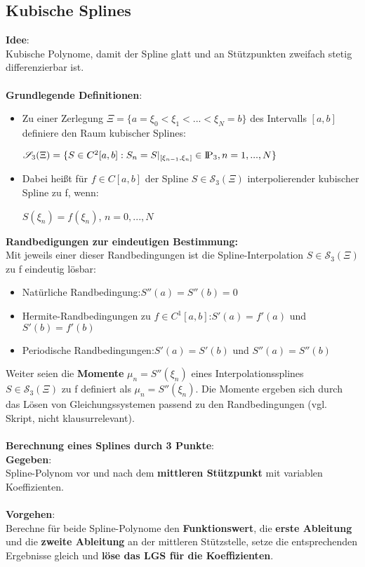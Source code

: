 \documentclass[10pt,a4paper]{article}
\def\polynomials{{\rm I\!P}}
\begin{document}
	\subsection{Kubische Splines}
	\textbf{Idee}:\\Kubische Polynome, damit der Spline glatt und an Stützpunkten zweifach stetig differenzierbar ist.\\\\
	\textbf{Grundlegende Definitionen}:
	\begin{itemize}
		\item Zu einer Zerlegung $\Xi = \{a = \xi_0 < \xi_1 < ... < \xi_N = b\}$ des Intervalls $[a, b]$ definiere den Raum kubischer Splines:
		\begin{center}
			$\mathscr{S}_3(\Xi) = \{S \in C^2[a, b]: S_n = S|_{[\xi_{n-1}, \xi_n]} \in \polynomials_3, n = 1, ..., N\}$
		\end{center}
		\item Dabei heißt für $f \in C[a, b]$ der Spline $S \in \mathscr{S}_3(\Xi)$ interpolierender kubischer Spline zu f, wenn:
		\begin{center}
			$S(\xi_n) = f(\xi_n)$, $n = 0, ..., N$
		\end{center}
	\end{itemize}
	\textbf{Randbedigungen zur eindeutigen Bestimmung:}\\
	Mit jeweils einer dieser Randbedingungen ist die Spline-Interpolation $S \in \mathscr{S}_3(\Xi)$ zu f eindeutig lösbar:
	\begin{itemize}
		\item Natürliche Randbedingung:\hfill$S''(a) = S''(b) = 0$
		\item Hermite-Randbedingungen zu $f \in C^1[a, b]$:\hfill$S'(a) = f'(a)$ und $S'(b) = f'(b)$
		\item Periodische Randbedingungen:\hfill$S'(a) = S'(b)$ und $S''(a) = S''(b)$
	\end{itemize}
	Weiter seien die \textbf{Momente} $\mu_n = S''(\xi_n)$ eines Interpolationssplines $S \in \mathscr{S}_3(\Xi)$ zu f definiert als $\mu_n = S''(\xi_n)$. Die Momente ergeben sich durch das Lösen von Gleichungssystemen passend zu den Randbedingungen (vgl. Skript, nicht klausurrelevant).\\\\
	\textbf{Berechnung eines Splines durch 3 Punkte}:\\
	\textbf{Gegeben}:\\Spline-Polynom vor und nach dem \textbf{mittleren Stützpunkt} mit variablen Koeffizienten.\\\\
	\textbf{Vorgehen}:\\Berechne für beide Spline-Polynome den \textbf{Funktionswert}, die \textbf{erste Ableitung} und die \textbf{zweite Ableitung} an der mittleren Stützstelle, setze die entsprechenden Ergebnisse gleich und \textbf{löse das LGS für die Koeffizienten}.
\end{document}
